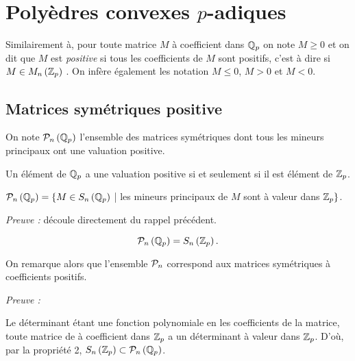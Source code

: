 \section{Polyèdres convexes \texorpdfstring{$p$}{p}-adiques}
\begin{notation}

	Similairement à, pour toute matrice $M$ à coefficient dans $\Qp$ on note $M\ge 0$ et on dit que $M$ est \textit{positive} si tous les coefficients de $M$  sont positifs, c'est à dire si $M \in M_n\left( \Zp \right) $ . On infère également les notation $M\le 0$, $M>0$ et $M<0$.     
\end{notation}

\subsection{Matrices symétriques positive} 

\begin{definition}
	On note $\P_n\left( \Qp \right) $ l'ensemble des matrices symétriques dont tous les mineurs principaux ont une valuation positive.
\end{definition} 

\begin{rappel}
	
Un élément de $ \Qp$ a une valuation positive si et seulement si il est élément de $\Zp$. 
\end{rappel}

\begin{propriete}
	
	$\P_n\left( \Qp \right) = \{ M \in S_n\left( \Qp \right)$ | les\- min\-eurs\- prin\-ci\-paux\- de\- $M$ \-sont \-à \-va\-leur \-dans\- $\Zp \} $.
\end{propriete}

	\textit{Preuve :} découle directement du rappel précédent. 
	\medskip


\begin{prop}
	 \[
		 \Pn = S_n\left( \Zp \right) 
	.\]  
\end{prop}

\begin{remarque}
	On remarque alors que l'ensemble $\P_n$ correspond aux matrices symétriques à coefficients positifs.   
\end{remarque}
	\textit{Preuve :}

 Le déterminant étant une fonction polynomiale en les coefficients de la matrice, toute matrice de à coefficient dans $\Zp$ a un déterminant à valeur dans $\Zp$. D'où, par la propriété 2, $S_n\left( \Zp \right) \subset \Pn $.

